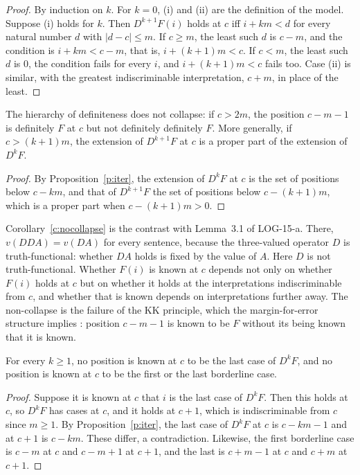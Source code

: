 \documentclass{situationist-preprint}
\begin{document}
\begin{proof}
By induction on $k$. For $k = 0$, (i) and (ii) are the definition of the model. Suppose (i) holds for $k$. Then $D^{k+1}F(i)$ holds at $c$ iff $i + km < d$ for every natural number $d$ with $|d - c| \leq m$. If $c \geq m$, the least such $d$ is $c - m$, and the condition is $i + km < c - m$, that is, $i + (k+1)m < c$. If $c < m$, the least such $d$ is $0$, the condition fails for every $i$, and $i + (k+1)m < c$ fails too. Case (ii) is similar, with the greatest indiscriminable interpretation, $c + m$, in place of the least.
\end{proof}

\begin{corollary}\label{c:nocollapse}
The hierarchy of definiteness does not collapse: if $c > 2m$, the position $c - m - 1$ is definitely $F$ at $c$ but not definitely definitely $F$. More generally, if $c > (k+1)m$, the extension of $D^{k+1} F$ at $c$ is a proper part of the extension of $D^k F$.
\end{corollary}

\begin{proof}
By Proposition~\ref{p:iter}, the extension of $D^k F$ at $c$ is the set of positions below $c - km$, and that of $D^{k+1} F$ the set of positions below $c - (k+1)m$, which is a proper part when $c - (k+1)m > 0$.
\end{proof}

Corollary~\ref{c:nocollapse} is the contrast with Lemma~3.1 of LOG-15-a. There, $v(DDA) = v(DA)$ for every sentence, because the three-valued operator $D$ is truth-functional: whether $DA$ holds is fixed by the value of $A$. Here $D$ is not truth-functional. Whether $F(i)$ is known at $c$ depends not only on whether $F(i)$ holds at $c$ but on whether it holds at the interpretations indiscriminable from $c$, and whether that is known depends on interpretations further away. The non-collapse is the failure of the KK principle, which the margin-for-error structure implies \citep[ch.~5]{Williamson2000}: position $c - m - 1$ is known to be $F$ without its being known that it is known.

\begin{proposition}\label{p:edges}
For every $k \geq 1$, no position is known at $c$ to be the last case of $D^k F$, and no position is known at $c$ to be the first or the last borderline case.
\end{proposition}

\begin{proof}
Suppose it is known at $c$ that $i$ is the last case of $D^k F$. Then this holds at $c$, so $D^k F$ has cases at $c$, and it holds at $c + 1$, which is indiscriminable from $c$ since $m \geq 1$. By Proposition~\ref{p:iter}, the last case of $D^k F$ at $c$ is $c - km - 1$ and at $c + 1$ is $c - km$. These differ, a contradiction. Likewise, the first borderline case is $c - m$ at $c$ and $c - m + 1$ at $c + 1$, and the last is $c + m - 1$ at $c$ and $c + m$ at $c + 1$.
\end{proof}
\end{document}
